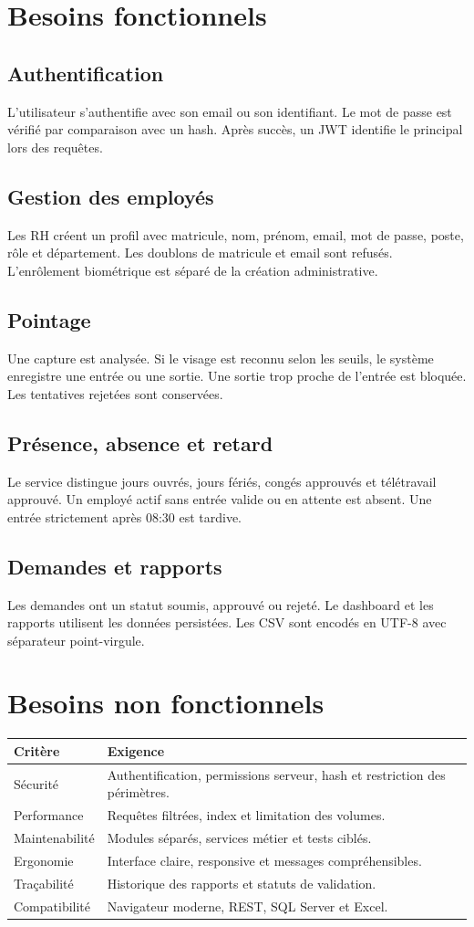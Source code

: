 \documentclass[11pt,a4paper,oneside]{report}
\begin{document}
\section{Besoins fonctionnels}
\subsection{Authentification}
L'utilisateur s'authentifie avec son email ou son identifiant. Le mot de passe est vérifié par comparaison avec un hash. Après succès, un JWT identifie le principal lors des requêtes.
\subsection{Gestion des employés}
Les RH créent un profil avec matricule, nom, prénom, email, mot de passe, poste, rôle et département. Les doublons de matricule et email sont refusés. L'enrôlement biométrique est séparé de la création administrative.
\subsection{Pointage}
Une capture est analysée. Si le visage est reconnu selon les seuils, le système enregistre une entrée ou une sortie. Une sortie trop proche de l'entrée est bloquée. Les tentatives rejetées sont conservées.
\subsection{Présence, absence et retard}
Le service distingue jours ouvrés, jours fériés, congés approuvés et télétravail approuvé. Un employé actif sans entrée valide ou en attente est absent. Une entrée strictement après 08:30 est tardive.
\subsection{Demandes et rapports}
Les demandes ont un statut soumis, approuvé ou rejeté. Le dashboard et les rapports utilisent les données persistées. Les CSV sont encodés en UTF-8 avec séparateur point-virgule.
\section{Besoins non fonctionnels}
\begin{longtable}{p{4cm}p{9.5cm}}
\toprule\textbf{Critère} & \textbf{Exigence}\\\midrule
Sécurité & Authentification, permissions serveur, hash et restriction des périmètres.\\
Performance & Requêtes filtrées, index et limitation des volumes.\\
Maintenabilité & Modules séparés, services métier et tests ciblés.\\
Ergonomie & Interface claire, responsive et messages compréhensibles.\\
Traçabilité & Historique des rapports et statuts de validation.\\
Compatibilité & Navigateur moderne, REST, SQL Server et Excel.\\
\bottomrule
\end{longtable}
\end{document}
